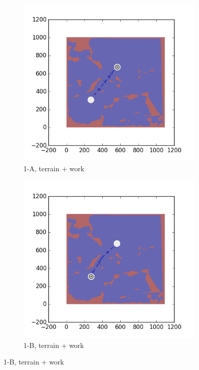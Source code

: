 \documentclass{tamuccthesis}
\begin{document}
\begin{figure}[H]
    \begin{subfigure}[b]{0.35\textwidth}
        \centering
        \includegraphics[width=\textwidth,trim={3cm 3cm 3cm 3cm},clip]{EXP3RG_PathAa_-1_-1_-1_0.png}
        \caption{{\small1-A, terrain + work}}    
        \label{fig:Path_1-A_terrain_work}
    \end{subfigure}
    \hfill
    \begin{subfigure}[b]{0.35\textwidth}  
        \centering 
        \includegraphics[width=\textwidth,trim={3cm 3cm 3cm 3cm},clip]{EXP3RG_PathAb_-1_-1_-1_0.png}
        \caption{{\small1-B, terrain + work}}   
        \label{fig:Path_1-B_terrain_work}
    \end{subfigure}


\end{figure}
\end{document}
